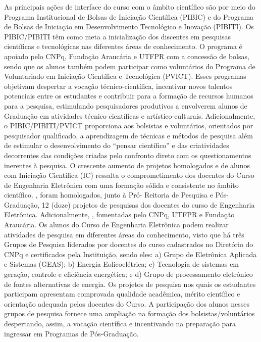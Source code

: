 As principais ações de interface do curso com o âmbito científico são por meio do Programa Institucional de Bolsas de Iniciação Científica (PIBIC) e do Programa de Bolsas de Iniciação em Desenvolvimento Tecnológico e Inovação (PIBITI). Os PIBIC/PIBITI têm como meta a inicialização dos discentes em pesquisas científicas e tecnológicas nas diferentes áreas de conhecimento. O programa é apoiado pelo CNPq, Fundação Araucária e UTFPR com a concessão de bolsas, sendo que os alunos também podem participar como voluntários do Programa de Voluntariado em Iniciação Científica e Tecnológica (PVICT). Esses programas objetivam despertar a vocação técnico-científica, incentivar novos talentos potenciais entre os estudantes e contribuir para a formação de recursos humanos para a pesquisa, estimulando pesquisadores produtivos a envolverem alunos de Graduação em atividades técnico-científicas e artístico-culturais. Adicionalmente, o PIBIC/PIBITI/PVICT proporciona aos bolsistas e voluntários, orientados por pesquisador qualificado, a aprendizagem de técnicas e métodos de pesquisa além de estimular o desenvolvimento do ``pensar científico'' e das criatividades decorrentes das condições criadas pelo confronto direto com os questionamentos inerentes à pesquisa. O crescente aumento de projetos homologados e de alunos com Iniciação Científica (IC) ressalta o comprometimento dos docentes do Curso de Engenharia Eletrônica com uma formação sólida e consistente no âmbito científico. , foram homologados, junto à Pró- Reitoria de Pesquisa e Pós-Graduação, 12 (doze) projetos de pesquisas dos docentes do curso de Engenharia Eletrônica. Adicionalmente, , fomentadas pelo CNPq, UTFPR e Fundação Araucária. Os alunos do Curso de Engenharia Eletrônica podem realizar atividades de pesquisa em diferentes áreas do conhecimento, visto que há três Grupos de Pesquisa liderados por docentes do curso cadastrados no Diretório do CNPq e certificados pela Instituição, sendo eles: a) Grupo de Eletrônica Aplicada e Sistemas (GEAS); b) Energia Eolicoelétrica; c) Tecnologia de sistemas em geração, controle e eficiência energética; e d) Grupo de processamento eletrônico de fontes alternativas de energia. Os projetos de pesquisa nos quais os estudantes participam apresentam comprovada qualidade acadêmica, mérito científico e orientação adequada pelos docentes do Curso. A participação dos alunos nesses grupos de pesquisa fornece uma ampliação na formação dos bolsistas/voluntários despertando, assim, a vocação científica e incentivando na preparação para ingressar em Programas de Pós-Graduação.


